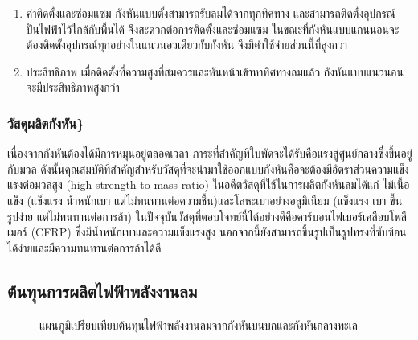 \documentclass[11pt]{article}
\begin{document}
\begin{enumerate}
\item ค่าติดตั้งและซ่อมแซม กังหันแบบตั้งสามารถรับลมได้จากทุกทิศทาง และสามารถติดตั้งอุปกรณ์ปั่นไฟฟ้าไว้ใกล้กับพื้นได้ จึงสะดวกต่อการติดตั้งและซ่อมแซม ในขณะที่กังหันแบบแกนนอนจะต้องติดตั้งอุปกรณ์ทุกอย่างในแนวนอวเดียวกับกังหัน จึงมีค่าใช้จ่ายส่วนนี้ที่สูงกว่า
\item ประสิทธิภาพ เมื่อติดตั้งที่ความสูงที่สมควรและหันหน้าเข้าหาทิศทางลมแล้ว กังหันแบบแนวนอนจะมีประสิทธิภาพสูงกว่า
\end{enumerate}

\subsubsection{วัสดุผลิตกังหัน\}}
\label{sec:orgb51e0f1}

เนื่องจากกังหันต้องได้มีการหมุนอยู่ตลอดเวลา ภาระที่สำคัญที่ใบพัดจะได้รับคือแรงสู่ศูนย์กลางซึ่งขึ้นอยู่กับมวล ดังนั้นคุณสมบัติที่สำคัญสำหรับวัสดุที่จะนำมาใช้ออกแบบกังหันคือจะต้องมีอัตราส่วนความแข็งแรงต่อมวลสูง (high strength-to-mass ratio) ในอดีตวัสดุที่ใช้ในการผลิตกังหันลมได้แก่ ไม้เนื้อแข็ง (แข็งแรง น้ำหนักเบา แต่ไม่ทนทานต่อความชื้น)และโลหะเบาอย่างอลูมิเนียม (แข็งแรง เบา ขึ้นรูปง่าย แต่ไม่ทนทานต่อการล้า) ในปัจจุบันวัสดุที่ตอบโจทย์นี้ได้อย่างดีคือคาร์บอนไฟเบอร์เคลือบโพลีเมอร์ (CFRP) ซึ่งมีน้ำหนักเบาและความแข็งแรงสูง นอกจากนี้ยังสามารถขึ้นรูปเป็นรูปทรงที่ซับซ้อนได้ง่ายและมีความทนทานต่อการล้าได้ดี

\subsection{ต้นทุนการผลิตไฟฟ้าพลังงานลม}
\label{sec:org3764f43}

\begin{figure}[h]
  \centering
  \caption{แผนภูมิเปรียบเทียบต้นทุนไฟฟ้าพลังงานลมจากกังหันบนบกและกังหันกลางทะเล}
  \label{fig:land vs short wind power}
\end{figure}
\end{document}
